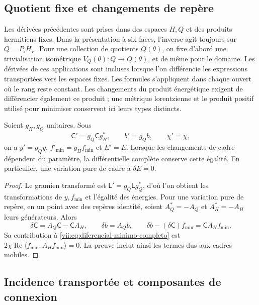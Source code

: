 \subsection{Quotient fixe et changements de repère}
\label{vii:subsec:marcos-minimo}

Les dérivées précédentes sont prises dans des espaces \(H,Q\) et des produits hermitiens fixes. Dans la présentation à six faces, l'inverse agit toujours sur \(Q=P_\square H_F\). Pour une collection de quotients \(Q(\theta)\), on fixe d'abord une trivialisation isométrique \(V_Q(\theta):Q\to Q(\theta)\), et de même pour le domaine. Les dérivées de ces applications sont incluses lorsque l'on différencie les expressions transportées vers les espaces fixes. Les formules s'appliquent dans chaque ouvert où le rang reste constant. Les changements du produit énergétique exigent de différencier également ce produit ; une métrique lorentzienne et le produit positif utilisé pour minimiser conservent ici leurs types distincts.

\begin{proposition}
\label{vii:prop:covariancia-minimo}
Soient \(g_H,g_Q\) unitaires. Sous
\[
 \mathsf C'=g_Q\mathsf C g_H^*,\qquad b'=g_Qb,\qquad \chi'=\chi,
\]
on a \(y'=g_Qy\), \(f'_{\min}=g_Hf_{\min}\) et \(E'=E\).
Lorsque les changements de cadre dépendent du paramètre, la différentielle
complète conserve cette égalité. En particulier, une variation pure de
cadre a \(\delta E=0\).
\end{proposition}

\begin{proof}
Le gramien transformé est \(\mathsf L'=g_Q\mathsf Lg_Q^*\),
d'où l'on obtient les transformations de \(y,f_{\min}\) et
l'égalité des énergies. Pour une variation pure de repère, en un point
avec des repères identité, soient \(A_Q^*=-A_Q\) et \(A_H^*=-A_H\)
leurs générateurs. Alors
\[
 \delta\mathsf C=A_Q\mathsf C-\mathsf C A_H,\qquad
 \delta b=A_Qb,\qquad
 \delta b-(\delta\mathsf C)f_{\min}=\mathsf C A_Hf_{\min}.
\]
Sa contribution à \eqref{vii:eq:diferencial-minimo-completo} est
\(2\chi\operatorname{Re}\langle f_{\min},A_Hf_{\min}\rangle=0\).
La preuve inclut ainsi les termes dus aux cadres mobiles.
\end{proof}

\subsection{Incidence transportée et composantes de connexion}
\label{vii:subsec:incidencia-conexion-minima}

